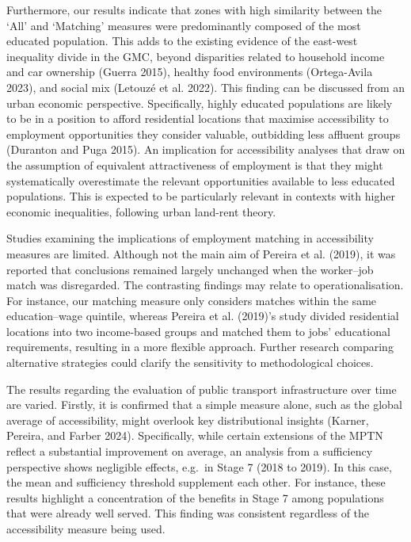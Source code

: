 \documentclass{article}
\begin{document}
Furthermore, our results indicate that zones with high similarity
between the `All' and `Matching' measures were predominantly composed of
the most educated population. This adds to the existing evidence of the
east-west inequality divide in the GMC, beyond disparities related to
household income and car ownership (Guerra 2015), healthy food
environments (Ortega-Avila 2023), and social mix (Letouzé et al. 2022).
This finding can be discussed from an urban economic perspective.
Specifically, highly educated populations are likely to be in a position
to afford residential locations that maximise accessibility to
employment opportunities they consider valuable, outbidding less
affluent groups (Duranton and Puga 2015). An implication for
accessibility analyses that draw on the assumption of equivalent
attractiveness of employment is that they might systematically
overestimate the relevant opportunities available to less educated
populations. This is expected to be particularly relevant in contexts
with higher economic inequalities, following urban land-rent theory.

Studies examining the implications of employment matching in
accessibility measures are limited. Although not the main aim of Pereira
et al. (2019), it was reported that conclusions remained largely
unchanged when the worker--job match was disregarded. The contrasting
findings may relate to operationalisation. For instance, our matching
measure only considers matches within the same education--wage quintile,
whereas Pereira et al. (2019)'s study divided residential locations into
two income-based groups and matched them to jobs' educational
requirements, resulting in a more flexible approach. Further research
comparing alternative strategies could clarify the sensitivity to
methodological choices.

The results regarding the evaluation of public transport infrastructure
over time are varied. Firstly, it is confirmed that a simple measure
alone, such as the global average of accessibility, might overlook key
distributional insights (Karner, Pereira, and Farber 2024).
Specifically, while certain extensions of the MPTN reflect a substantial
improvement on average, an analysis from a sufficiency perspective shows
negligible effects, e.g.~in Stage 7 (2018 to 2019). In this case, the
mean and sufficiency threshold supplement each other. For instance,
these results highlight a concentration of the benefits in Stage 7 among
populations that were already well served. This finding was consistent
regardless of the accessibility measure being used.
\end{document}
